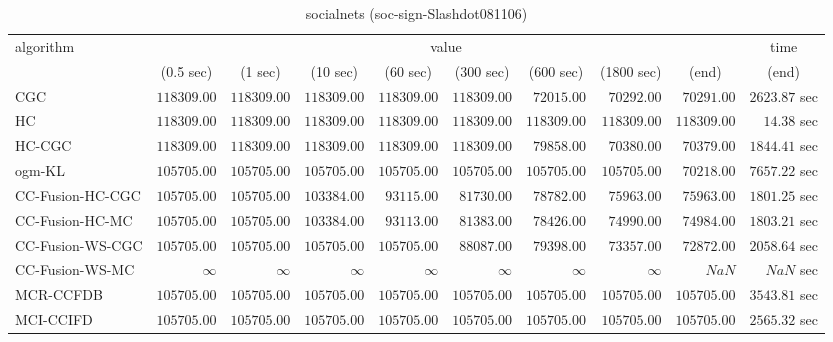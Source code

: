 \begin{table}[H]
\scriptsize
\centering
\caption{socialnets (soc-sign-Slashdot081106)}
\label{tab:anytimetable-socialnets-soc-sign-Slashdot081106}
\begin{tabular}{lrrrrrrrrr}
\toprule
           algorithm &                                   \multicolumn{8}{c}{value} & \multicolumn{1}{c}{time}   \\  
\cmidrule(lr){2-9}\cmidrule(lr){10-10}   
                     & \multicolumn{1}{c}{(0.5 sec)} & \multicolumn{1}{c}{(1 sec)} & \multicolumn{1}{c}{(10 sec)} & \multicolumn{1}{c}{(60 sec)} & \multicolumn{1}{c}{(300 sec)} & \multicolumn{1}{c}{(600 sec)} & \multicolumn{1}{c}{(1800 sec)} & \multicolumn{1}{c}{(end)} & \multicolumn{1}{c}{(end)}   \\ \midrule 
                 CGC & $    118309.00$ & $    118309.00$ & $    118309.00$ & $    118309.00$ & $    118309.00$ & $     72015.00$ & $     70292.00$ & $     70291.00$ & $      2623.87$ sec   \\ 
                  HC & $    118309.00$ & $    118309.00$ & $    118309.00$ & $    118309.00$ & $    118309.00$ & $    118309.00$ & $    118309.00$ & $    118309.00$ & $        14.38$ sec   \\ 
              HC-CGC & $    118309.00$ & $    118309.00$ & $    118309.00$ & $    118309.00$ & $    118309.00$ & $     79858.00$ & $     70380.00$ & $     70379.00$ & $      1844.41$ sec   \\ 
              ogm-KL & $    105705.00$ & $    105705.00$ & $    105705.00$ & $    105705.00$ & $    105705.00$ & $    105705.00$ & $    105705.00$ & $     70218.00$ & $      7657.22$ sec   \\ 
    CC-Fusion-HC-CGC & $    105705.00$ & $    105705.00$ & $    103384.00$ & $     93115.00$ & $     81730.00$ & $     78782.00$ & $     75963.00$ & $     75963.00$ & $      1801.25$ sec   \\ 
     CC-Fusion-HC-MC & $    105705.00$ & $    105705.00$ & $    103384.00$ & $     93113.00$ & $     81383.00$ & $     78426.00$ & $     74990.00$ & $     74984.00$ & $      1803.21$ sec   \\ 
    CC-Fusion-WS-CGC & $    105705.00$ & $    105705.00$ & $    105705.00$ & $    105705.00$ & $     88087.00$ & $     79398.00$ & $     73357.00$ & $     72872.00$ & $      2058.64$ sec   \\ 
     CC-Fusion-WS-MC & $\infty$ & $\infty$ & $\infty$ & $\infty$ & $\infty$ & $\infty$ & $\infty$ & $          NaN$ & $          NaN$ sec   \\ 
\cmidrule{1-1} 
           MCR-CCFDB & $    105705.00$ & $    105705.00$ & $    105705.00$ & $    105705.00$ & $    105705.00$ & $    105705.00$ & $    105705.00$ & $    105705.00$ & $      3543.81$ sec   \\ 
\cmidrule{1-1} 
           MCI-CCIFD & $    105705.00$ & $    105705.00$ & $    105705.00$ & $    105705.00$ & $    105705.00$ & $    105705.00$ & $    105705.00$ & $    105705.00$ & $      2565.32$ sec   \\ 
\bottomrule
\end{tabular}
\end{table}

